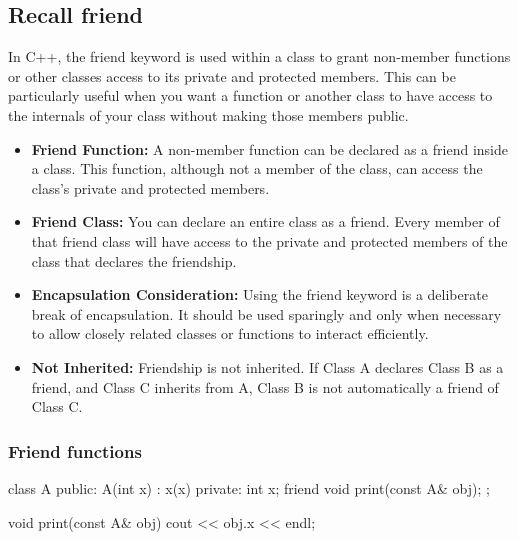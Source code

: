 \documentclass{report}
\begin{document}
\pagebreak 
{}
\bigbreak \noindent 
\subsection{Recall friend}
\bigbreak \noindent 
In C++, the friend keyword is used within a class to grant non-member functions or other classes access to its private and protected members. This can be particularly useful when you want a function or another class to have access to the internals of your class without making those members public.
\begin{itemize}
    \item \textbf{Friend Function:} A non-member function can be declared as a friend inside a class. This function, although not a member of the class, can access the class's private and protected members.
    \item \textbf{Friend Class:} You can declare an entire class as a friend. Every member of that friend class will have access to the private and protected members of the class that declares the friendship.
    \item \textbf{Encapsulation Consideration:} Using the friend keyword is a deliberate break of encapsulation. It should be used sparingly and only when necessary to allow closely related classes or functions to interact efficiently.
    \item \textbf{Not Inherited:} Friendship is not inherited. If Class A declares Class B as a friend, and Class C inherits from A, Class B is not automatically a friend of Class C.
\end{itemize}


\bigbreak \noindent 
\subsubsection{Friend functions}
\bigbreak \noindent 
\begin{cppcode}
    class A {
        public:
        A(int x) : x(x) {}
        private:
        int x{};
        friend void print(const A& obj); 
    };

    void print(const A& obj) {
        cout << obj.x << endl;
    }
\end{cppcode}

\bigbreak \noindent 
\end{document}

